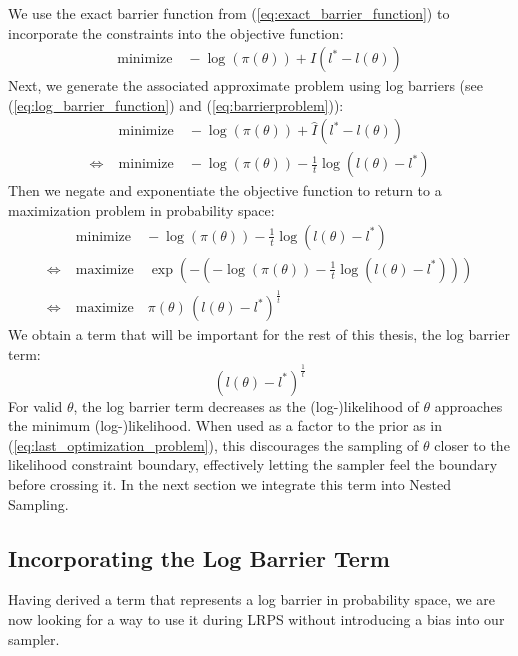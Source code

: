 \documentclass[12pt, a4paper]{report}
\begin{document}
We use the exact barrier function from (\ref{eq:exact_barrier_function}) to incorporate the constraints into the objective function:
\begin{align}
    \textrm{minimize} \quad -\log(\pi(\theta)) + I(l^* - l(\theta)) \nonumber
\end{align}
Next, we generate the associated approximate problem using log barriers (see (\ref{eq:log_barrier_function}) and (\ref{eq:barrierproblem})):
\begin{align*}
    &\textrm{minimize} \quad -\log(\pi(\theta)) + \hat{I}(l^* - l(\theta)) \\
    \iff \; &\textrm{minimize} \quad -\log(\pi(\theta)) - \frac{1}{t}\log(l(\theta) - l^*)
\end{align*}
Then we negate and exponentiate the objective function to return to a maximization problem in probability space:
\begin{align}
    &\textrm{minimize} \quad -\log(\pi(\theta)) - \frac{1}{t}\log(l(\theta) - l^*) \nonumber\\
    \iff \; &\textrm{maximize} \quad \exp\left(-\left(-\log(\pi(\theta)) - \frac{1}{t}\log(l(\theta) - l^*)\right)\right) \nonumber\\
    \iff \; &\textrm{maximize} \quad \pi(\theta) \, (l(\theta) - l^*)^{\frac{1}{t}} \label{eq:last_optimization_problem}
\end{align}
We obtain a term that will be important for the rest of this thesis, the log barrier term:
\begin{equation}
    (l(\theta) - l^*)^\frac{1}{t} \label{eq:log_barrier_term}
\end{equation}
For valid $\theta$, the log barrier term decreases as the (log-)likelihood of $\theta$ approaches the minimum (log-)likelihood.
When used as a factor to the prior as in (\ref{eq:last_optimization_problem}), this discourages the sampling of $\theta$ closer to the likelihood constraint boundary, effectively letting the sampler feel the boundary before crossing it.
In the next section we integrate this term into Nested Sampling.

\subsection{Incorporating the Log Barrier Term}
Having derived a term that represents a log barrier in probability space, we are now looking for a way to use it during LRPS without introducing a bias into our sampler.
\end{document}
